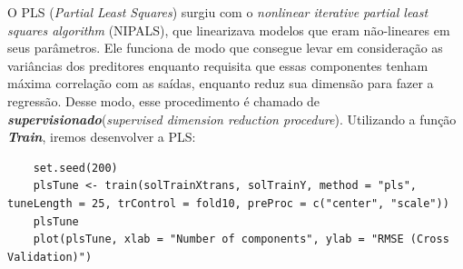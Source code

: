 \documentclass[a4paper,11pt]{article}
\begin{document}
	O PLS (\textit{Partial Least Squares}) surgiu com o \textit{nonlinear iterative partial least squares algorithm} (NIPALS), que linearizava modelos que eram não-lineares em seus parâmetros. Ele funciona de modo que consegue levar em consideração as variâncias dos preditores enquanto requisita que essas componentes tenham máxima correlação com as saídas, enquanto reduz sua dimensão para fazer a regressão. Desse modo, esse procedimento é chamado de \textit{\textbf{supervisionado}}(\textit{supervised dimension reduction procedure}).
	Utilizando a função \textit{\textbf{Train}}, iremos desenvolver a PLS:
	\begin{verbatim}
	set.seed(200)
	plsTune <- train(solTrainXtrans, solTrainY, method = "pls", tuneLength = 25, trControl = fold10, preProc = c("center", "scale"))
	plsTune
	plot(plsTune, xlab = "Number of components", ylab = "RMSE (Cross Validation)")
	\end{verbatim}
\end{document}
